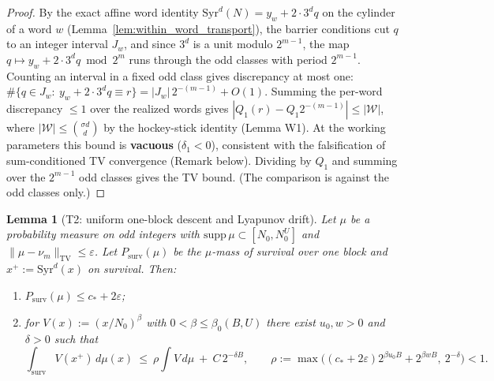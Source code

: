 \documentclass[12pt,a4paper]{article}
\newtheorem{lemma}[theorem]{Lemma}
\begin{document}
\begin{proof}
By the exact affine word identity
$\mathrm{Syr}^d(N)=y_w+2\cdot3^d q$ on the cylinder of a word $w$
(Lemma~\ref{lem:within_word_transport}), the barrier conditions cut $q$ to an
integer interval $J_w$, and since $3^d$ is a unit modulo $2^{m-1}$, the map
$q\mapsto y_w+2\cdot3^dq\bmod2^m$ runs through the odd classes with period
$2^{m-1}$. Counting an interval in a fixed odd class gives discrepancy at most
one:
$\#\{q\in J_w:\ y_w+2\cdot3^dq\equiv r\}=|J_w|\,2^{-(m-1)}+O(1)$.
Summing the per-word discrepancy $\le 1$ over the realized words gives $|Q_1(r) - Q_1 2^{-(m-1)}| \le |\mathcal{W}|$, where $|\mathcal{W}| \le \binom{\sigma d}{d}$ by the hockey-stick identity (Lemma W1). At the working parameters this bound is \textbf{vacuous} ($\delta_1 < 0$), consistent with the falsification of sum-conditioned TV convergence (Remark below). Dividing by $Q_1$ and summing over the $2^{m-1}$ odd classes gives the
TV bound. (The comparison is against the odd classes only.)
\end{proof}

\begin{lemma}[T2: uniform one-block descent and Lyapunov drift]
\label{lem:T2}
Let $\mu$ be a probability measure on odd integers with
$\mathrm{supp}\,\mu\subset[N_0,N_0^{U}]$ and $\|\mu-\nu_m\|_{\mathrm{TV}}\le\varepsilon$.
Let $P_{\mathrm{surv}}(\mu)$ be the $\mu$-mass of survival over one block and
$x^+:=\mathrm{Syr}^d(x)$ on survival. Then:
\begin{enumerate}
\item[(i)] $P_{\mathrm{surv}}(\mu)\le c_*+2\varepsilon$;
\item[(ii)] for $V(x):=(x/N_0)^{\beta}$ with $0<\beta\le\beta_0(B,U)$ there exist
$u_0,w>0$ and $\delta>0$ such that
\[
\int_{\mathrm{surv}}V(x^+)\,d\mu(x)
\ \le\ \rho\int V\,d\mu\ +\ C\,2^{-\delta B},
\qquad
\rho:=\max\big((c_*+2\varepsilon)2^{\beta u_0B}+2^{\beta wB},\ 2^{-\delta}\big)<1 .
\]
\end{enumerate}
\end{lemma}
\end{document}
